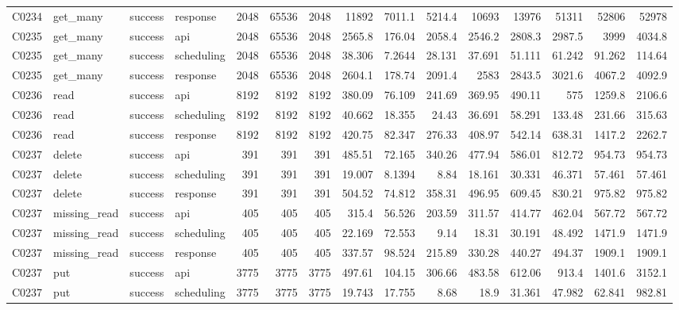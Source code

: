 \begin{landscape}
\begin{longtable}{llllrrrrrrrrrrr}
C0234 & get\_\allowbreak{}many & success & response & 2048 & 65536 & 2048 & 11892 & 7011.1 & 5214.4 & 10693 & 13976 & 51311 & 52806 & 52978\\
C0235 & get\_\allowbreak{}many & success & api & 2048 & 65536 & 2048 & 2565.8 & 176.04 & 2058.4 & 2546.2 & 2808.3 & 2987.5 & 3999 & 4034.8\\
C0235 & get\_\allowbreak{}many & success & scheduling & 2048 & 65536 & 2048 & 38.306 & 7.2644 & 28.131 & 37.691 & 51.111 & 61.242 & 91.262 & 114.64\\
C0235 & get\_\allowbreak{}many & success & response & 2048 & 65536 & 2048 & 2604.1 & 178.74 & 2091.4 & 2583 & 2843.5 & 3021.6 & 4067.2 & 4092.9\\
C0236 & read & success & api & 8192 & 8192 & 8192 & 380.09 & 76.109 & 241.69 & 369.95 & 490.11 & 575 & 1259.8 & 2106.6\\
C0236 & read & success & scheduling & 8192 & 8192 & 8192 & 40.662 & 18.355 & 24.43 & 36.691 & 58.291 & 133.48 & 231.66 & 315.63\\
C0236 & read & success & response & 8192 & 8192 & 8192 & 420.75 & 82.347 & 276.33 & 408.97 & 542.14 & 638.31 & 1417.2 & 2262.7\\
C0237 & delete & success & api & 391 & 391 & 391 & 485.51 & 72.165 & 340.26 & 477.94 & 586.01 & 812.72 & 954.73 & 954.73\\
C0237 & delete & success & scheduling & 391 & 391 & 391 & 19.007 & 8.1394 & 8.84 & 18.161 & 30.331 & 46.371 & 57.461 & 57.461\\
C0237 & delete & success & response & 391 & 391 & 391 & 504.52 & 74.812 & 358.31 & 496.95 & 609.45 & 830.21 & 975.82 & 975.82\\
C0237 & missing\_\allowbreak{}read & success & api & 405 & 405 & 405 & 315.4 & 56.526 & 203.59 & 311.57 & 414.77 & 462.04 & 567.72 & 567.72\\
C0237 & missing\_\allowbreak{}read & success & scheduling & 405 & 405 & 405 & 22.169 & 72.553 & 9.14 & 18.31 & 30.191 & 48.492 & 1471.9 & 1471.9\\
C0237 & missing\_\allowbreak{}read & success & response & 405 & 405 & 405 & 337.57 & 98.524 & 215.89 & 330.28 & 440.27 & 494.37 & 1909.1 & 1909.1\\
C0237 & put & success & api & 3775 & 3775 & 3775 & 497.61 & 104.15 & 306.66 & 483.58 & 612.06 & 913.4 & 1401.6 & 3152.1\\
C0237 & put & success & scheduling & 3775 & 3775 & 3775 & 19.743 & 17.755 & 8.68 & 18.9 & 31.361 & 47.982 & 62.841 & 982.81\\

\end{longtable}
\end{landscape}
